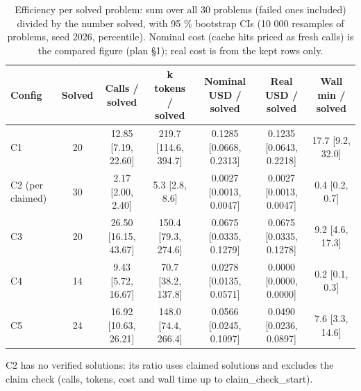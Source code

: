 \begin{table}[t]
\centering
\scriptsize
\setlength{\tabcolsep}{3pt}
\caption{Efficiency per solved problem: sum over all 30 problems (failed ones included) divided by the number solved, with 95 \% bootstrap CIs (10 000 resamples of problems, seed 2026, percentile). Nominal cost (cache hits priced as fresh calls) is the compared figure (plan §1); real cost is from the kept rows only.}
\label{tab:eff-solved}
\begin{tabular}{lcccccc}
\toprule
Config & Solved & Calls / solved & k tokens / solved & Nominal USD / solved & Real USD / solved & Wall min / solved \\
\midrule
C1 & 20 & 12.85 {[}7.19, 22.60{]} & 219.7 {[}114.6, 394.7{]} & 0.1285 {[}0.0668, 0.2313{]} & 0.1235 {[}0.0643, 0.2218{]} & 17.7 {[}9.2, 32.0{]} \\
C2 (per claimed) & 30 & 2.17 {[}2.00, 2.40{]} & 5.3 {[}2.8, 8.6{]} & 0.0027 {[}0.0013, 0.0047{]} & 0.0027 {[}0.0013, 0.0047{]} & 0.4 {[}0.2, 0.7{]} \\
C3 & 20 & 26.50 {[}16.15, 43.67{]} & 150.4 {[}79.3, 274.6{]} & 0.0675 {[}0.0335, 0.1279{]} & 0.0675 {[}0.0335, 0.1278{]} & 9.2 {[}4.6, 17.3{]} \\
C4 & 14 & 9.43 {[}5.72, 16.67{]} & 70.7 {[}38.2, 137.8{]} & 0.0278 {[}0.0135, 0.0571{]} & 0.0000 {[}0.0000, 0.0000{]} & 0.2 {[}0.1, 0.3{]} \\
C5 & 24 & 16.92 {[}10.63, 26.21{]} & 148.0 {[}74.4, 266.4{]} & 0.0566 {[}0.0245, 0.1097{]} & 0.0490 {[}0.0236, 0.0897{]} & 7.6 {[}3.3, 14.6{]} \\
\bottomrule
\end{tabular}

\vspace{2pt}
\parbox{\linewidth}{\scriptsize C2 has no verified solutions: its ratio uses claimed solutions and excludes the claim check (calls, tokens, cost and wall time up to claim\_check\_start).}
\end{table}

